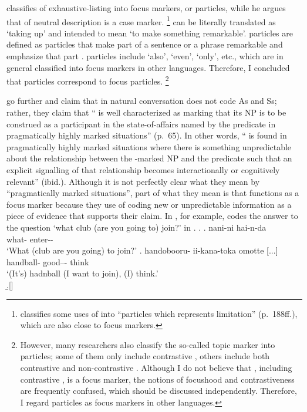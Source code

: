  classifies  of exhaustive-listing into focus markers, or  particles,
while he argues that  of neutral description is a case marker.%
 \footnote{
  classifies some uses of  into ``particles which represents limitation'' (p.~188ff.),
 which are also close to focus markers.
 }
 can be literally translated as `taking up'
and intended to mean `to make something remarkable'.
 particles are defined as
particles that make part of a sentence or a phrase remarkable and emphasize that part \cite[p.~178]{miyata48}.
 particles include  `also',  `even',
 `only', etc.,
which are in general classified into focus markers in other languages.
Therefore, I concluded that  particles correspond to
focus particles.%
 \footnote{
 However, many researchers also classify the so-called topic marker 
  into  particles;
 some of them only include contrastive   \cite{okutsu74,okutsu86,numata86},
 others include both contrastive and non-contrastive 
 \cite{miyata48,suzuki72,teramura81,noda95}.
 Although I do not believe that , including contrastive , is a focus marker,
 the notions of focushood and contrastiveness are frequently confused,
 which should be discussed independently.
 Therefore, I regard  particles as focus markers
 in other languages.}

 go further and claim that
 in natural conversation does not code As and Ss;
rather, they claim that
`` is well characterized as marking that its NP is to be construed as a participant in the state-of-affairs named by the predicate in pragmatically highly marked situations'' (p.~65).
In other words,
`` is found in pragmatically highly marked situations where
there is something unpredictable about the relationship between
the -marked NP and the predicate such that
an explicit signalling of that relationship becomes interactionally or cognitively relevant'' (ibid.).
Although it is not perfectly clear what they mean by
``pragmatically marked situations'',
part of what they mean is that
 functions as a focus marker
because they use  of coding new or unpredictable information
as a piece of evidence that supports their claim.
In \Next[b], for example,
 codes the answer to the question
`what club (are you going to) join?' in \Next[a].
%
\ex.
 \ag. nani-ni hai-n-da \\
      what- enter-- \\
      `What (club are you going) to join?'
 \bg. handobooru- ii-kana-toka omotte [...] \\
      handball- good--- think \\
      `(It's) hadnball (I want to join), (I) think.' \\
 \b.[]     \hfill{\cite[p.~70]{onoetal00}}


